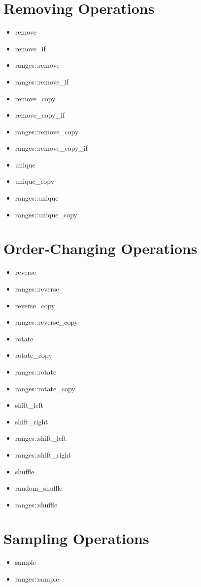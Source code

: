 \documentclass{article}
\begin{document}
\section{Removing Operations}
    \begin{itemize}
      \item remove
      \item remove\_if
      \item ranges::remove
      \item ranges::remove\_if
      \item remove\_copy
      \item remove\_copy\_if
      \item ranges::remove\_copy
      \item ranges::remove\_copy\_if
      \item unique
      \item unique\_copy
      \item ranges::unique
      \item ranges::unique\_copy
    \end{itemize}
\section{Order-Changing Operations}
    \begin{itemize}
      \item reverse
      \item ranges::reverse
      \item reverse\_copy
      \item ranges::reverse\_copy
      \item rotate
      \item rotate\_copy
      \item ranges::rotate
      \item ranges::rotate\_copy
      \item shift\_left
      \item shift\_right
      \item ranges::shift\_left
      \item ranges::shift\_right
      \item shuffle
      \item random\_shuffle
      \item ranges::shuffle
    \end{itemize}
\section{Sampling Operations}
    \begin{itemize}
      \item sample
      \item ranges::sample
    \end{itemize}
\end{document}
